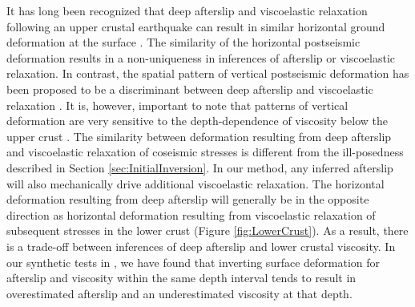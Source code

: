 \documentclass[review]{elsarticle}
\begin{document}
It has long been recognized that deep afterslip and viscoelastic relaxation following an upper crustal earthquake can result in similar horizontal ground deformation at the surface \citep[e.g.][]{Savage1990, Pollitz2001,Hearn2003,Feigl2006}. The similarity of the horizontal postseismic deformation results in a non-uniqueness in inferences of afterslip or viscoelastic relaxation. In contrast, the spatial pattern of vertical postseismic deformation has been proposed to be a discriminant between deep afterslip and viscoelastic relaxation \citep[e.g.][]{Pollitz2001, Hearn2003}. It is, however, important to note that patterns of vertical deformation are very sensitive to the depth-dependence of viscosity below the upper crust \citep{Yang1981, Hetland2014}.  The similarity between deformation resulting from deep afterslip and viscoelastic relaxation of coseismic stresses is different from the ill-posedness described in Section \ref{sec:InitialInversion}. In our method, any inferred afterslip will also mechanically drive additional viscoelastic relaxation.  The horizontal deformation resulting from deep afterslip will generally be in the opposite direction as horizontal deformation resulting from viscoelastic relaxation of subsequent stresses in the lower crust (Figure \ref{fig:LowerCrust}).  As a result, there is a trade-off between inferences of deep afterslip and lower crustal viscosity.  In our synthetic tests in \citet{Hines2016}, we have found that inverting surface deformation for afterslip and viscosity within the same depth interval tends to result in overestimated afterslip and an underestimated viscosity at that depth.
\end{document}
